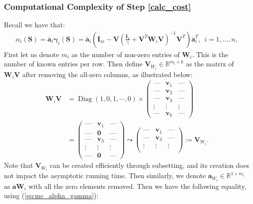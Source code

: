 \documentclass[twoside,11pt]{article}
\newcommand{\md}[1]{\mathbb{#1}}
\DeclareMathOperator\diag{Diag}
\begin{document}
\subsubsection*{Computational Complexity of Step \ref{calc_cost}}
Recall we have that:
\begin{align*}
    \alpha_i(\bm{S})=\overline{\bm{a}}_i \bm{\gamma}_i(\bm{S})=\overline{\bm{a}}_i
\left(\bm{I}_m-\bm{V}\left(\frac{\bm{I}_k}{\gamma}+\bm{V}^T\bm{W}_i\bm{V}\right)^{-1}\bm{V}^T\right)\overline{\bm{a}}_i^T, ~~i=1,\ldots,n,
\end{align*}
First let us denote $m_i$ as the number of non-zero entries of $\bm{W}_i$. This is the number of known entries per row. Then  define $\bm{V}_{W_i} \in \md{R}^{m_i\times k}$ as the matrix of $\bm{W}_i\bm{V}$ after removing the all-zero columns, as illustrated below:
\begin{align}
 \bm{W}_i\bm{V}&= \diag(1,0,1,\cdots,0) \times  \begin{pmatrix}
 \text{---} & \bm{v}_1 & \text{---}  \\
 \text{---} & \bm{v}_2 & \text{---} \\ 
 \text{---} & \bm{v}_3 & \text{---} \\
 \vdots & \vdots & \vdots \\
 \text{---} & \bm{v}_k & \text{---} 
 \end{pmatrix}\nonumber\\&=\begin{pmatrix}
 \text{---} & \bm{v}_1 & \text{---}  \\
 \text{---} & \bm{0} & \text{---} \\ 
 \text{---} & \bm{v}_3 & \text{---} \\
 \vdots & \vdots & \vdots \\
 \text{---} & \bm{0} & \text{---} 
 \end{pmatrix} \leadsto \begin{pmatrix}
 \text{---} & \bm{v}_1 & \text{---}  \\
 \text{---} & \bm{v}_3 & \text{---} \\
 \vdots & \vdots & \vdots \\
 \end{pmatrix} :=\bm{V}_{W_i} .\label{simpdefi}
\end{align}
Note that $\bm{V}_{W_i}$ can be created efficiently through subsetting, and its creation does not impact the asymptotic running time. Then similarly, we denote $\bm{a}_{W_i}\in \md{R}^{1 \times m_i}$ as $\bm{a}\bm{W}_i$ with all the zero elements removed. Then we have the following equality, using (\ref{eq:mc_alpha_gamma}):
\end{document}

